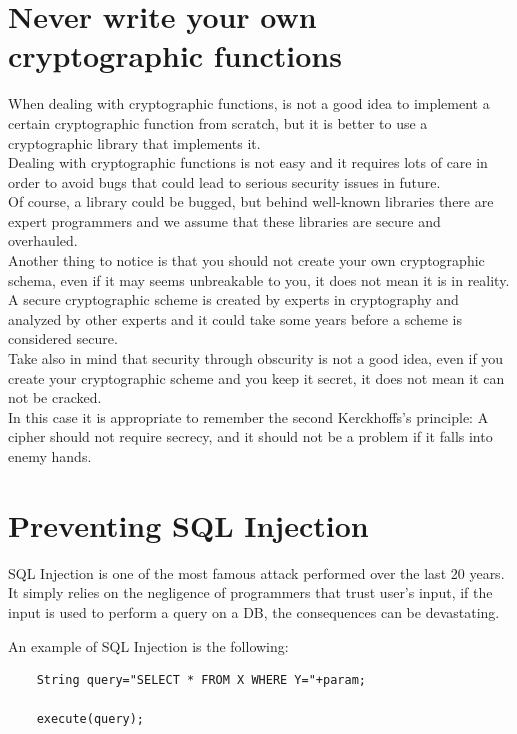 \section{Never write your own cryptographic functions}
When dealing with cryptographic functions, is not a good idea to implement a certain cryptographic function from scratch, but it is better to use a cryptographic library that implements it.\\
Dealing with cryptographic functions is not easy and it requires lots of care in order to avoid bugs that could lead to serious security issues in future.\\
Of course, a library could be bugged, but behind well-known libraries there are expert programmers and we assume that these libraries are secure and overhauled.\\

Another thing to notice is that you should not create your own cryptographic schema, even if it may seems unbreakable to you, it does not mean it is in reality.\\
A secure cryptographic scheme is created by experts in cryptography and analyzed by other experts and it could take some years before a scheme is considered secure.\\
Take also in mind that security through obscurity is not a good idea, even if you create your cryptographic scheme and you keep it secret, it does not mean it can not be cracked.\\
In this case it is appropriate to remember the second Kerckhoffs's principle:
A cipher should not require secrecy, and it should not be a problem if it falls into enemy hands.\\

\section{Preventing SQL Injection}
SQL Injection is one of the most famous attack performed over the last 20 years.\newline
It simply relies on the negligence of programmers that trust user's input, if the input is used to perform
a query on a DB, the consequences can be devastating.\newline

An example of SQL Injection is the following:

\begin{lstlisting}
	String query="SELECT * FROM X WHERE Y="+param;
	
	execute(query);
\end{lstlisting} 

